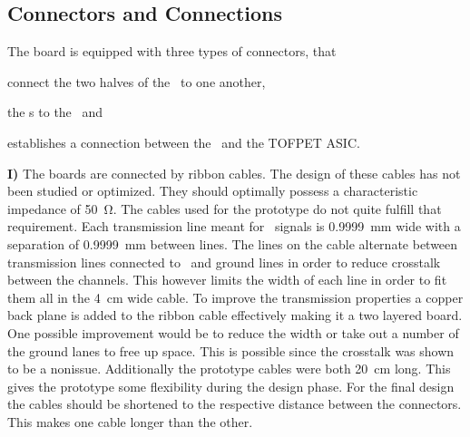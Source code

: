 \documentclass[../BTOF_summary.tex]{subfiles}
\begin{document}
\subsection{Connectors and Connections}

The board is equipped with three types of connectors, that 
\begin{enumerate*}[I) ]
	\item  connect the two halves of the \railboard\ to one another, 
	\item the \sensorboard s to the \railboard\ and 
	\item establishes a connection between the \railboard\ and the TOFPET ASIC.
\end{enumerate*}

\textbf{I)} 
The boards are connected by ribbon cables.
The design of these cables has not been studied or optimized.
They should optimally possess a characteristic impedance of \SI{50}{\ohm}.
The cables used for the prototype do not quite fulfill that requirement.
Each transmission line meant for \sipm\ signals is \SI{0.9999}{mm} wide with a separation of \SI{0.9999}{mm} between lines.
The lines on the cable alternate between transmission lines connected to \sipms\ and ground lines in order to reduce crosstalk between the channels.
This however limits the width of each line in order to fit them all in the \SI{4}{cm} wide cable.
To improve the transmission properties a copper back plane is added to the ribbon cable effectively making it a two layered board.
One possible improvement would be to reduce the width or take out a number of the ground lanes to free up space.
This is possible since the crosstalk was shown to be a nonissue.
Additionally the prototype cables were both \SI{20}{cm} long.
This gives the prototype some flexibility during the design phase.
For the final design the cables should be shortened to the respective distance between the connectors.
This makes one cable longer than the other.
\end{document}
